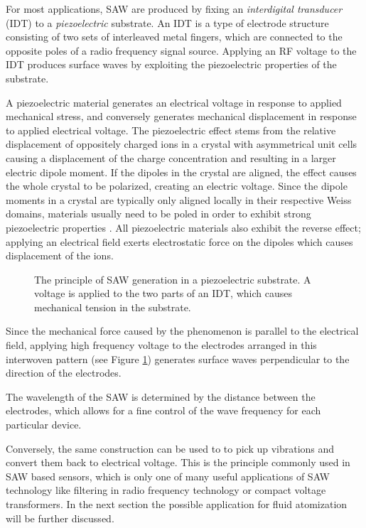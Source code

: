 For most applications, SAW are produced by fixing an \emph{interdigital transducer} (IDT) to a \emph{piezoelectric} substrate. An IDT is a type of electrode structure consisting of two sets of interleaved metal fingers, which are connected to the opposite poles of a radio frequency signal source. Applying an RF voltage to the IDT produces surface waves by exploiting the piezoelectric properties of the substrate.

A piezoelectric material generates an electrical voltage in response to applied mechanical stress, and conversely generates mechanical displacement in response to applied electrical voltage. 
The piezoelectric effect stems from the relative displacement of oppositely charged ions in a crystal with asymmetrical unit cells causing a displacement of the charge concentration and resulting in a larger electric dipole moment. 
If the dipoles in the crystal are aligned, the effect causes the whole crystal to be polarized, creating an electric voltage. 
Since the dipole moments in a crystal are typically only aligned locally in their respective Weiss domains, materials usually need to be poled in order to exhibit strong piezoelectric properties \cite{liLeadfreePiezoelectricMaterials2021}.
All piezoelectric materials also exhibit the reverse effect; applying an electrical field exerts electrostatic force on the dipoles which causes displacement of the ions.

\begin{figure}[htbp]
    \centering
    \caption{The principle of SAW generation in a piezoelectric substrate. A voltage is applied to the two parts of an IDT, which causes mechanical tension in the substrate.}
    \label{fig:idt}
\end{figure}

Since the mechanical force caused by the phenomenon is parallel to the electrical field, applying high frequency voltage to the electrodes arranged in this interwoven pattern (see Figure \ref{fig:idt}) generates surface waves perpendicular to the direction of the electrodes.

The wavelength of the SAW is determined by the distance between the electrodes, which allows for a fine control of the wave frequency for each particular device.

Conversely, the same construction can be used to to pick up vibrations and convert them back to electrical voltage. 
This is the principle commonly used in SAW based sensors, which is only one of many useful applications of SAW technology like filtering in radio frequency technology or compact voltage transformers. 
In the next section the possible application for fluid atomization will be further discussed.